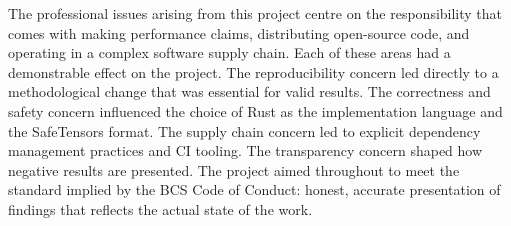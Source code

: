 The professional issues arising from this project centre on the responsibility that comes with making performance claims, distributing open-source code, and operating in a complex software supply chain. Each of these areas had a demonstrable effect on the project. The reproducibility concern led directly to a methodological change that was essential for valid results. The correctness and safety concern influenced the choice of Rust as the implementation language and the SafeTensors format. The supply chain concern led to explicit dependency management practices and CI tooling. The transparency concern shaped how negative results are presented. The project aimed throughout to meet the standard implied by the BCS Code of Conduct: honest, accurate presentation of findings that reflects the actual state of the work.
